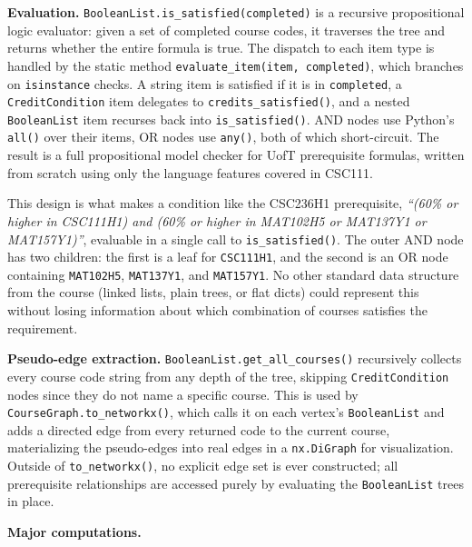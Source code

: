 \documentclass[11pt]{article}
\begin{document}
\textbf{Evaluation.} \verb|BooleanList.is_satisfied(completed)| is a recursive propositional
logic evaluator: given a set of completed course codes, it traverses the tree and returns
whether the entire formula is true. The dispatch to each item type is handled by the static
method \verb|evaluate_item(item, completed)|, which branches on \verb|isinstance| checks.
A string item is satisfied if it is in \verb|completed|, a \verb|CreditCondition| item
delegates to \verb|credits_satisfied()|, and a nested \verb|BooleanList| item recurses
back into \verb|is_satisfied()|. AND nodes use Python's \verb|all()| over their items, OR
nodes use \verb|any()|, both of which short-circuit. The result is a full propositional model
checker for UofT prerequisite formulas, written from scratch using only the language features
covered in CSC111.

This design is what makes a condition like the CSC236H1 prerequisite,
\textit{``(60\% or higher in CSC111H1) and (60\% or higher in MAT102H5 or MAT137Y1 or MAT157Y1)''},
evaluable in a single call to \verb|is_satisfied()|. The outer AND node has two children:
the first is a leaf for \verb|CSC111H1|, and the second is an OR node containing
\verb|MAT102H5|, \verb|MAT137Y1|, and \verb|MAT157Y1|. No other standard data structure
from the course (linked lists, plain trees, or flat dicts) could represent this without
losing information about which combination of courses satisfies the requirement.

\textbf{Pseudo-edge extraction.} \verb|BooleanList.get_all_courses()| recursively collects
every course code string from any depth of the tree, skipping \verb|CreditCondition| nodes
since they do not name a specific course. This is used by \verb|CourseGraph.to_networkx()|,
which calls it on each vertex's \verb|BooleanList| and adds a directed edge from every
returned code to the current course, materializing the pseudo-edges into real edges in a
\verb|nx.DiGraph| for visualization. Outside of \verb|to_networkx()|, no explicit edge set
is ever constructed; all prerequisite relationships are accessed purely by evaluating the
\verb|BooleanList| trees in place.

\textbf{Major computations.}
\end{document}
